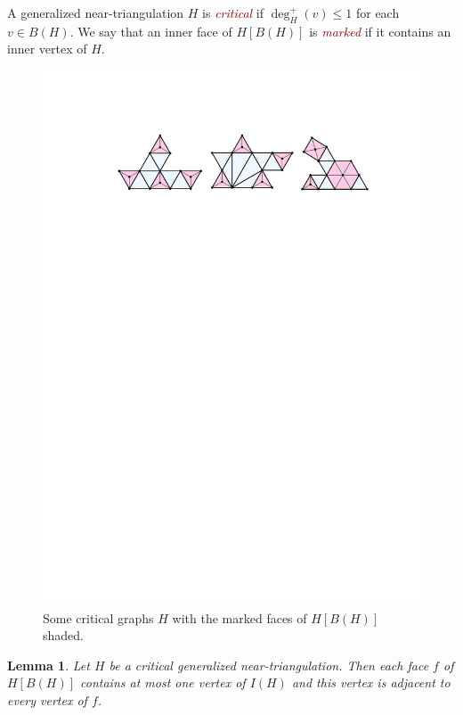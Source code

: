 \documentclass{article}
\newtheorem{lem}{Lemma}
\newcommand{\defin}[1]{\emph{\textcolor{Maroon}{#1}}}
\theoremstyle{definition}
\begin{document}
A generalized near-triangulation $H$ is \defin{critical} if $\deg^+_H(v)\le 1$ for each $v\in B(H)$. We say that an inner face of $H[B(H)]$ is \defin{marked} if it contains an inner vertex of $H$.

\begin{figure}[htbp]
    \centering
    \includegraphics[page=1]{figs/critical}
    \caption{Some critical graphs $H$ with the marked faces of $H[B(H)]$ shaded.}
    \label{critical_fig}
\end{figure}


\begin{lem}\label{critical_structure}
    Let $H$ be a critical generalized near-triangulation. Then each face $f$ of $H[B(H)]$ contains at most one vertex of $I(H)$ and this vertex is adjacent to every vertex of $f$.
\end{lem}
\end{document}
